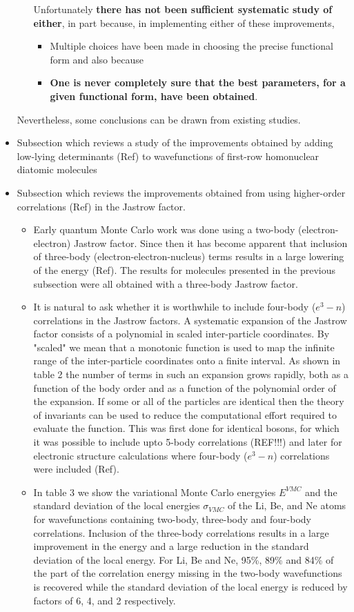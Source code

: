 \documentclass[twoside,english]{uiofysmaster}
\begin{document}
\begin{itemize}
\begin{itemize}
\begin{itemize}
		\end{itemize}
		Unfortunately \textbf{there has not been sufficient systematic study of either}, in part because, in implementing either of these improvements, 
		\begin{itemize}
			\item Multiple choices have been made in choosing the precise functional form and also because
			\item \textbf{One is never completely sure that the best parameters, for a given functional form, have been obtained}.
		\end{itemize}
	\end{itemize}
	Nevertheless, some conclusions can be drawn from existing studies.
	\item Subsection which reviews a study of the improvements obtained by adding low-lying determinants (Ref) to wavefunctions of first-row homonuclear diatomic molecules 
	\item Subsection which reviews the improvements obtained from using higher-order correlations (Ref) in the Jastrow factor.
	\begin{itemize}
		\item Early quantum Monte Carlo work was done using a two-body (electron-electron) Jastrow factor. Since then it has become apparent that inclusion of three-body (electron-electron-nucleus) terms results in a large lowering of the energy (Ref). The results for molecules presented in the previous subsection were all obtained with a three-body Jastrow factor. 
		\item It is natural to ask whether it is worthwhile to include four-body ($e^3-n$) correlations in the Jastrow factors. A systematic expansion of the Jastrow factor consists of a polynomial in scaled inter-particle coordinates. By "scaled" we mean that a monotonic function is used to map the infinite range of the inter-particle coordinates onto a finite interval. As shown in table 2 the number of terms in such an expansion grows rapidly, both as a function of the body order and as a function of the polynomial order of the expansion. If some or all of the particles are identical then the theory of invariants can be used to reduce the computational effort required to evaluate the function. This was first done for identical bosons, for which it was possible to include upto 5-body correlations (REF!!!) and later for electronic structure calculations where four-body ($e^3-n$) correlations were included (Ref).
		\item In table 3 we show the variational Monte Carlo energyies $E^{VMC}$ and the standard deviation of the local energies $\sigma_{VMC}$ of the Li, Be, and Ne atoms for wavefunctions containing two-body, three-body and four-body correlations. Inclusion of the three-body correlations results in a large improvement in the energy and a large reduction in the standard deviation of the local energy. For Li, Be and Ne, 95\%, 89\% and 84\% of the part of the correlation energy missing in the two-body wavefunctions is recovered while the standard deviation of the local energy is reduced by factors of 6, 4, and 2 respectively. 

\end{itemize}
\end{itemize}
\end{document}
